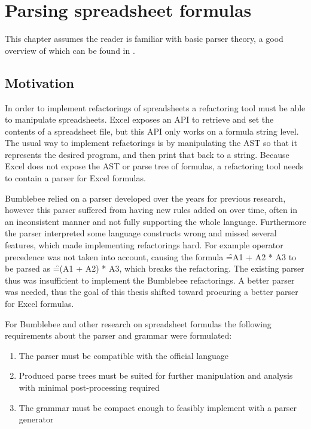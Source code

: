 \chapter{Parsing spreadsheet formulas}
\label{chapter:parsing}

\noindent
\begin{figure}[h]
\centerfloat

\end{figure}


\noindent
This chapter assumes the reader is familiar with basic parser theory, a good overview of which can be found in \cite{dragonbook}.

\section{Motivation}

In order to implement refactorings of spreadsheets a refactoring tool must be able to manipulate spreadsheets.
Excel exposes an API to retrieve and set the contents of a spreadsheet file, but this API only works on a formula string level.
The usual way to implement refactorings is by manipulating the AST so that it represents the desired program, and then print that back to a string.
Because Excel does not expose the AST or parse tree of formulas, a refactoring tool needs to contain a parser for Excel formulas.

Bumblebee relied on a parser developed over the years for previous research, however this parser suffered from having new rules added on over time, often in an inconsistent manner and not fully supporting the whole language.
Furthermore the parser interpreted some language constructs wrong and missed several features, which made implementing refactorings hard.
For example operator precedence was not taken into account, causing the formula \f{=A1 + A2 * A3} to be parsed as \f{=(A1 + A2) * A3}, which breaks the  refactoring.
The existing parser thus was insufficient to implement the Bumblebee refactorings.
A better parser was needed, thus the goal of this thesis shifted toward procuring a better parser for Excel formulas.

For Bumblebee and other research on spreadsheet formulas the following requirements about the parser and grammar were formulated:

\begin{enumerate}
\label{sec:designgoals}
\item The parser must be compatible with the official language
\item Produced parse trees must be suited for further manipulation and analysis with minimal post-processing required
\item The grammar must be compact enough to feasibly implement with a parser generator
\end{enumerate}


